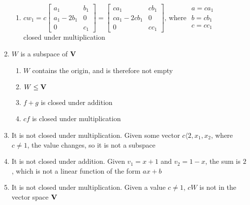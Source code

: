 \documentclass[12pt]{article}
\begin{document}
\begin{enumerate}
\begin{enumerate}
      \item $cw_1=c\begin{bmatrix} a_1 & b_1\\ a_1-2b_1 & 0\\ 0 & c_1  \end{bmatrix}=\begin{bmatrix} ca_1 & cb_1\\ ca_1-2cb_1 & 0\\ 0 & cc_1  \end{bmatrix}\text{, where }\begin{array}{c} a=ca_1\\ b=cb_1\\ c=cc_1  \end{array}$\\ closed under multiplication \textcolor{green}{\checkmark}

    \end{enumerate}

  \item $W$ is a subspace of $\bold{V}$

    \begin{enumerate}

      \item $W$ contains the origin, and is therefore not empty \textcolor{green}{\checkmark}

      \item $W\leq\bold{V}$ \textcolor{green}{\checkmark}

      \item $f+g$ is closed under addition \textcolor{green}{\checkmark}

      \item $cf$ is closed under multiplication \textcolor{green}{\checkmark}

    \end{enumerate}

    \setcounter{enumi}{7}

  \item It is not closed under multiplication. Given some vector $c\langle 2, x_1, x_2$, where $c\neq1$, the value changes, so it is not a subspace

    \setcounter{enumi}{11}

  \item It is not closed under addition. Given $v_1=x+1$ and $v_2=1-x$, the sum is $2$, which is not a linear function of the form $ax+b$

    \setcounter{enumi}{14}

  \item It is not closed under multiplication. Given a value $c\neq1$, $cW$ is not in the vector space $\bold{V}$


\end{enumerate}
\end{document}

